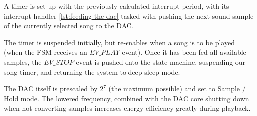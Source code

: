 A timer is set up with the previously calculated interrupt period, with its interrupt handler \ref{lst:feeding-the-dac} tasked with pushing the next sound sample of the currently selected song to the DAC.

The timer is suspended initially, but re-enables when a song is to be played (when the FSM receives an $ EV\_PLAY $ event).
Once it has been fed all available samples, the $ EV\_STOP $ event is pushed onto the state machine, suspending our song timer, and returning the system to deep sleep mode.



The DAC itself is prescaled by $ 2^{7} $ (the maximum possible) and set to Sample / Hold mode.
The lowered frequency, combined with the DAC core shutting down when not converting samples increases energy efficiency greatly during playback\cite{referencemanual}.

